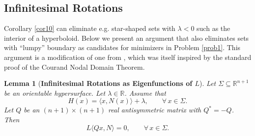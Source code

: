 \documentclass[12pt,reqno]{amsart}
\newtheorem{lemma}[theorem]{Lemma}
\theoremstyle{definition}
\renewcommand{\subset}{\subseteq}
\newcommand{\R}{\mathbb{R}}
\newcommand{\embolden}[1]{\textbf {#1}}
\newcommand{\adimn}{n+1}
\newcommand{\scon}{\lambda}
\begin{document}
\subsection{Infinitesimal Rotations}

Corollary \ref{cor10} can eliminate e.g. star-shaped sets with $\scon<0$ such as the interior of a hyperboloid.  Below we present an argument that also eliminates sets with ``lumpy'' boundary as candidates for minimizers in Problem \ref{prob1}.  This argument is a modification of one from \cite{hutchings02}, which was itself inspired by the standard proof of the Courand Nodal Domain Theorem.


\begin{lemma}[\embolden{Infinitesimal Rotations as Eigenfunctions of $L$}]\label{lemma30f}
Let $\Sigma\subset\R^{\adimn}$ be an orientable hypersurface.  Let $\scon\in\R$.  Assume that
\begin{equation}\label{three0f}
H(x)=\langle x,N(x)\rangle+\scon,\qquad\forall\,x\in\Sigma.
\end{equation}
Let $Q$ be an $(\adimn)\times(\adimn)$ real antisymmetric matrix with $Q^{*}=-Q$.  Then
\begin{equation}\label{three9f}
L\langle Qx,N\rangle=0,\qquad\forall\,x\in\Sigma.
\end{equation}
\end{lemma}
\end{document}
